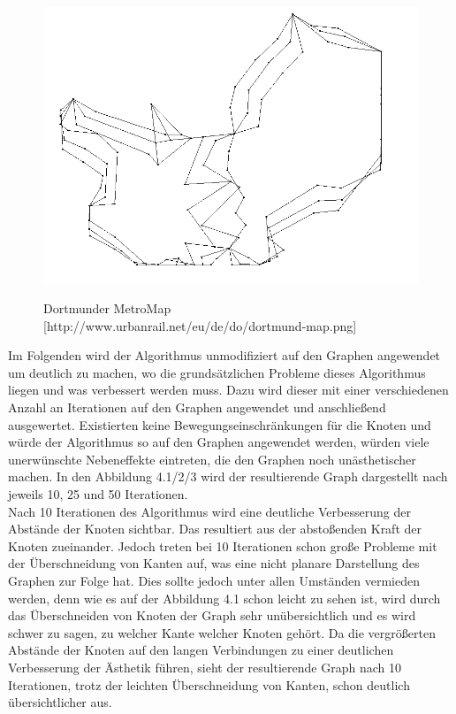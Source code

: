 \begin{figure}[t]
	\centering
	{\includegraphics[scale=0.8]{bilder/graph50iterationenreingold}\label{fig_dortmundmap}
	}\\
	\caption[Dortmunder MetroMap]{Dortmunder MetroMap [http://www.urbanrail.net/eu/de/do/dortmund-map.png]}
	\label{fig_dortmundmap}
\end{figure}
Im Folgenden wird der Algorithmus unmodifiziert auf den Graphen angewendet um deutlich zu machen, wo die grundsätzlichen Probleme dieses Algorithmus liegen und was verbessert werden muss. Dazu wird dieser mit einer verschiedenen Anzahl an Iterationen auf den Graphen angewendet und anschließend ausgewertet. Existierten keine Bewegungseinschränkungen für die Knoten und würde der Algorithmus so auf den Graphen angewendet werden, würden viele unerwünschte Nebeneffekte eintreten, die den Graphen noch unästhetischer machen. In den Abbildung 4.1/2/3 wird der resultierende Graph dargestellt nach jeweils 10, 25 und 50 Iterationen.\\

Nach 10 Iterationen des Algorithmus wird eine deutliche Verbesserung der Abstände der Knoten sichtbar. Das resultiert aus der abstoßenden Kraft der Knoten zueinander. Jedoch treten bei 10 Iterationen schon große Probleme mit der Überschneidung von Kanten auf, was eine nicht planare Darstellung des Graphen zur Folge hat. Dies sollte jedoch unter allen Umständen vermieden werden, denn wie es auf der Abbildung 4.1 schon leicht zu sehen ist, wird durch das Überschneiden von Knoten der Graph sehr unübersichtlich und es wird schwer zu sagen, zu welcher Kante welcher Knoten gehört. Da die vergrößerten Abstände der Knoten auf den langen Verbindungen zu einer deutlichen Verbesserung der Ästhetik führen, sieht der resultierende Graph nach 10 Iterationen, trotz der leichten Überschneidung von Kanten, schon deutlich übersichtlicher aus. \\

